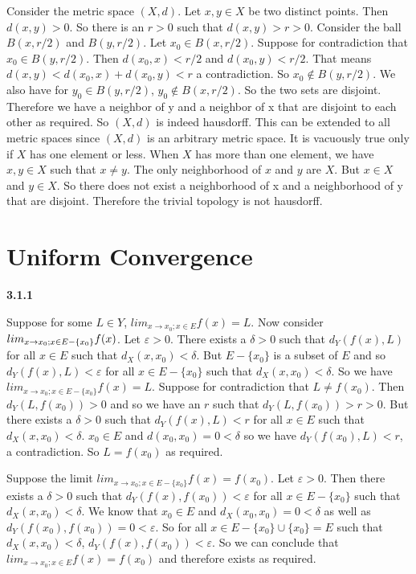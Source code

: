 \documentclass[12pt]{article}
\begin{document}
Consider the metric space $(X,d)$. Let $x,y\in X$ be two distinct points. Then $d(x,y) >0$. So there is an $r>0$ such that $d(x,y) >r>0$. Consider the ball $B(x,r/2)$ and $B(y,r/2)$. Let $x_0\in B(x,r/2)$. Suppose for contradiction that $x_0\in B(y,r/2)$. Then $d(x_0,x)<r/2$ and $d(x_0,y)<r/2$. That means $d(x,y)<d(x_0,x) + d(x_0,y) <r$ a contradiction. So $x_0\notin B(y,r/2)$. We also have for $y_0\in B(y,r/2)$, $y_0\notin B(x,r/2)$. So the two sets are disjoint. Therefore we have a neighbor of y and a neighbor of x that are disjoint to each other as required. So $(X,d)$ is indeed hausdorff. This can be extended to all metric spaces since $(X,d)$ is an arbitrary metric space. It is vacuously true only if $X$ has one element or less. When $X$ has more than one element, we have $x,y\in X$ such that $x\neq y$. The only neighborhood of $x$ and $y$ are $X$. But $x\in X$ and $y\in X$. So there does not exist a neighborhood of x and a neighborhood of y that are disjoint. Therefore the trivial topology is not hausdorff.

\section{Uniform Convergence}

\textbf{3.1.1}

Suppose for some $L\in Y$, $lim_{x\to x_0; x\in E}f(x) = L$. Now consider $\\lim_{x\to x_0; x\in E-\{x_0\}}f(x)$. Let $\varepsilon>0$. There exists a $\delta >0$ such that $d_Y(f(x), L)$ for all $x\in E$ such that $d_X(x,x_0) <\delta$. But $E-\{x_0\}$ is a subset of $E$ and so $d_Y(f(x),L)< \varepsilon$ for all $x\in E-\{x_0\}$ such that $d_X(x,x_0) <\delta$. So we have $lim_{x\to x_0; x\in E-\{x_0\}}f(x) = L$. Suppose for contradiction that $L \neq f(x_0)$. Then $d_Y(L,f(x_0))>0$ and so we have an $r$ such that $d_Y(L,f(x_0))>r>0$. But there exists a $\delta >0$ such that $d_Y(f(x),L)<r$ for all $x\in E$ such that $d_X(x,x_0) <\delta$. $x_0\in E$ and $d(x_0,x_0) = 0 < \delta$ so we have $d_Y(f(x_0),L) <r$, a contradiction. So $L= f(x_0)$ as required. 

Suppose the limit $lim_{x\to x_0; x\in E-\{x_0\}}f(x)=f(x_0)$. Let $\varepsilon>0$. Then there exists a $\delta >0$ such that $d_Y(f(x),f(x_0))<\varepsilon$ for all $x\in E-\{x_0\}$ such that $d_X(x,x_0)< \delta$. We know that $x_0\in E$ and $d_X(x_0,x_0) = 0 < \delta$ as well as $d_Y(f(x_0),f(x_0))=0<\varepsilon$. So for all $x\in E-\{x_0\} \cup \{x_0\} = E$ such that $d_X(x,x_0) < \delta$, $d_Y(f(x),f(x_0))<\varepsilon$. So we can conclude that $lim_{x\to x_0; x\in E} f(x)= f(x_0)$ and therefore exists as required.
\end{document}
